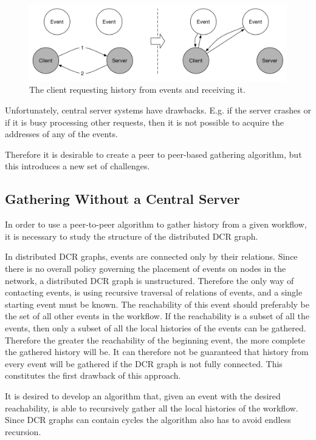     \begin{figure}[H]
    	\centering
    	\includegraphics[width=\textwidth]{4connect/images/server-contacts-events.pdf}
    	\caption{The client requesting history from events and receiving it.}
    	\label{fig:connecting:server-contacts-events}
    \end{figure}
    
    \newpar Unfortunately, central server systems have drawbacks. E.g. if the server crashes or if it is busy processing other requests, then it is not possible to acquire the addresses of any of the events.
    
    Therefore it is desirable to create a peer to peer-based gathering algorithm, but this introduces a new set of challenges.
    
    \subsection{Gathering Without a Central Server}
    In order to use a peer-to-peer algorithm to gather history from a given workflow, it is necessary to study the structure of the distributed DCR graph.
    
    \newpar In distributed DCR graphs, events are connected only by their relations. Since there is no overall policy governing the placement of events on nodes in the network, a distributed DCR graph is unstructured. Therefore the only way of contacting events, is using recursive traversal of relations of events, and a single starting event must be known. The reachability of this event should preferably be the set of all other events in the workflow. If the reachability is a subset of all the events, then only a subset of all the local histories of the events can be gathered. Therefore the greater the reachability of the beginning event, the more complete the gathered history will be. It can therefore not be guaranteed that history from every event will be gathered if the DCR graph is not fully connected. This constitutes the first drawback of this approach.
	
	It is desired to develop an algorithm that, given an event with the desired reachability, is able to recursively gather all the local histories of the workflow. Since DCR graphs can contain cycles the algorithm also has to avoid endless recursion.
		
